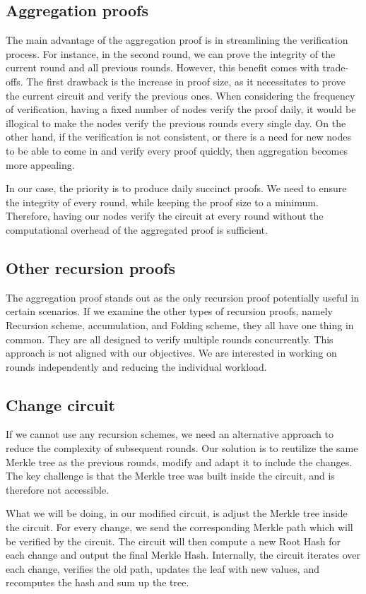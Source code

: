 \subsection{Aggregation proofs}
The main advantage of the aggregation proof is in streamlining the verification process. For instance, in the second round, we can prove the integrity of the current round and all previous rounds.
However, this benefit comes with trade-offs. The first drawback is the increase in proof size, as it necessitates to prove the current circuit and verify the previous ones.
When considering the frequency of verification, having a fixed number of nodes verify the proof daily, it would be illogical to make the nodes verify the previous rounds every single day.
On the other hand, if the verification is not consistent, or there is a need for new nodes to be able to come in and verify every proof quickly, then aggregation becomes more appealing.

In our case, the priority is to produce daily succinct proofs. We need to ensure the integrity of every round, while keeping the proof size to a minimum.
Therefore, having our nodes verify the circuit at every round without the computational overhead of the aggregated proof is sufficient.

\subsection{Other recursion proofs}
The aggregation proof stands out as the only recursion proof potentially useful in certain scenarios.
If we examine the other types of recursion proofs, namely Recursion scheme, accumulation, and Folding scheme, they all have one thing in common.
They are all designed to verify multiple rounds concurrently.
This approach is not aligned with our objectives. We are interested in working on rounds independently and reducing the individual workload.

\subsection{Change circuit}
If we cannot use any recursion schemes, we need an alternative approach to reduce the complexity of subsequent rounds.
Our solution is to reutilize the same Merkle tree as the previous rounds, modify and adapt it to include the changes.
The key challenge is that the Merkle tree was built inside the circuit, and is therefore not accessible.

What we will be doing, in our modified circuit, is adjust the Merkle tree inside the circuit.
For every change, we send the corresponding Merkle path which will be verified by the circuit.
The circuit will then compute a new Root Hash for each change and output the final Merkle Hash. 
Internally, the circuit iterates over each change, verifies the old path, updates the leaf with new values, and recomputes the hash and sum up the tree.

